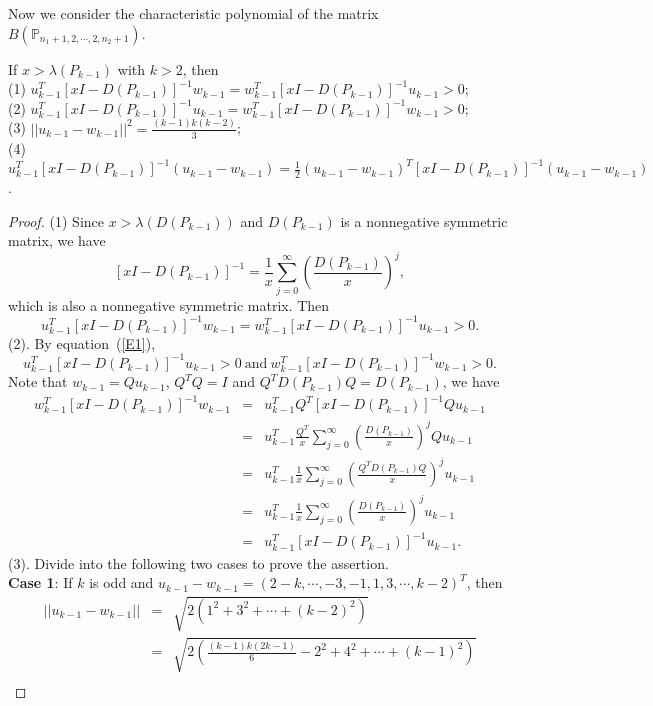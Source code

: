 \documentclass[10pt]{article}
\begin{document}
Now  we consider the  characteristic polynomial of the matrix $B(\mathbb{P}_{n_1+1,2,\cdots,2,n_2+1})$.
\begin{lemma}\label{Lem1}
If $x >\lambda(P_{k-1})$ with  $k>2$, then\\
(1) $u_{k-1}^{T}[x I-D(P_{k-1})]^{-1}w_{k-1}=w_{k-1}^T[x I-D(P_{k-1})]^{-1}u_{k-1}>0$;\\
(2) $u_{k-1}^T[x I-D(P_{k-1})]^{-1}u_{k-1}=w_{k-1}^T[x I-D(P_{k-1})]^{-1}w_{k-1}>0$;\\
(3) $||u_{k-1}-w_{k-1}||^2=\frac{(k-1)k(k-2)}{3}$;\\
(4) $u_{k-1}^T[x I-D(P_{k-1})]^{-1}(u_{k-1}-w_{k-1})=\frac{1}{2}(u_{k-1}-w_{k-1})^T[x I-D(P_{k-1})]^{-1}(u_{k-1}-w_{k-1})$.
\end{lemma}
\begin{proof}
(1) Since $x>\lambda(D(P_{k-1}))$ and $D(P_{k-1})$ is a nonnegative symmetric matrix, we have
\begin{equation}\label{E1}
[x I-D(P_{k-1})]^{-1}=\frac{1}{x}\sum_{j=0}^{\infty}\left(\frac{D(P_{k-1})}{x}\right)^j,
\end{equation}
which  is  also a nonnegative symmetric matrix. Then
$$u_{k-1}^T[x I-D(P_{k-1})]^{-1}w_{k-1}=w_{k-1}^T[x I-D(P_{k-1})]^{-1}u_{k-1}>0.$$
(2).  By equation~(\ref{E1}),
$$u_{k-1}^T[x I-D(P_{k-1})]^{-1}u_{k-1}>0 \ \mbox {and} ~w_{k-1}^T[x I-D(P_{k-1})]^{-1}w_{k-1}>0.$$
Note that $w_{k-1}=Qu_{k-1}$, $ Q^TQ=I$ and $Q^TD(P_{k-1})Q=D(P_{k-1})$, we have
\begin{eqnarray*}
w_{k-1}^T[x I-D(P_{k-1})]^{-1}w_{k-1}&=&u_{k-1}^TQ^T[x I-D(P_{k-1})]^{-1}Qu_{k-1}\\
&=&u_{k-1}^T\frac{Q^T}{x}\sum_{j=0}^{\infty}\left(\frac{D(P_{k-1})}{x}\right)^jQu_{k-1}\\
&=&u_{k-1}^T\frac{1}{x}\sum_{j=0}^{\infty}\left(\frac{Q^TD(P_{k-1})Q}{x}\right)^ju_{k-1}\\
&=&u_{k-1}^T\frac{1}{x}\sum_{j=0}^{\infty}\left(\frac{D(P_{k-1})}{x}\right)^ju_{k-1}\\
&=&u_{k-1}^T[x I-D(P_{k-1})]^{-1}u_{k-1}.
\end{eqnarray*}
(3). Divide into the following two cases to prove the assertion.\\
{\bf Case 1}: If $k$ is odd and $u_{k-1}-w_{k-1}=(2-k,\cdots,-3,-1,1,3,\cdots,k-2)^T$, then
\begin{eqnarray*}
||u_{k-1}-w_{k-1}||&=&\sqrt{2(1^2+3^2+\cdots+(k-2)^2)}\\
&=&\sqrt{2\left(\frac{(k-1)k(2k-1)}{6}-2^2+4^2+\cdots+(k-1)^2\right)}\\

\end{eqnarray*}
\end{proof}
\end{document}
